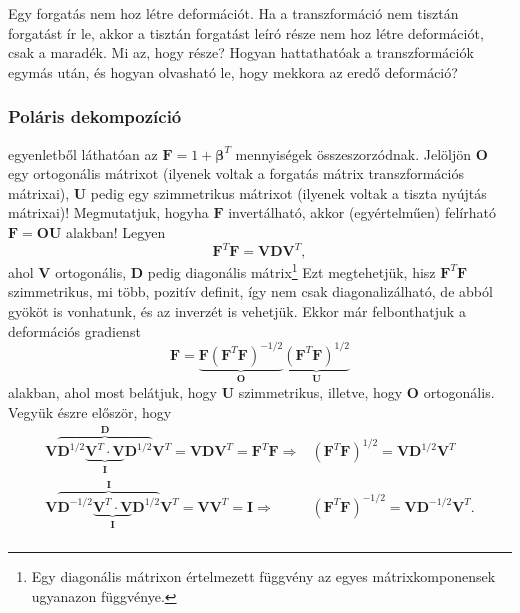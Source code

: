 \documentclass[12pt,a4paper]{scrartcl}
\let\mathbf\bm
\begin{document}
Egy forgatás nem hoz létre deformációt. Ha a transzformáció nem tisztán forgatást ír le, akkor a tisztán forgatást leíró része nem hoz létre deformációt, csak a maradék. Mi az, hogy része? Hogyan hattathatóak a transzformációk egymás után, és hogyan olvasható le, hogy mekkora az eredő deformáció?

\subsubsection{Poláris dekompozíció} \label{sec:polaris_dekomp}
\Az{\eqref{eq:disztrozio_def}} egyenletből láthatóan az ${\mathbf{F}} = 1 + {{\mathbf{\beta }}^T}$ mennyiségek összeszorzódnak. Jelöljön ${\mathbf{O}}$ egy ortogonális mátrixot (ilyenek voltak a forgatás mátrix transzformációs mátrixai), ${\mathbf{U}}$ pedig egy szimmetrikus mátrixot (ilyenek voltak a tiszta nyújtás mátrixai)! Megmutatjuk, hogyha ${\mathbf{F}}$ invertálható, akkor (egyértelműen) felírható ${\mathbf{F}} = {\mathbf{OU}}$ alakban!
Legyen
\[{{\mathbf{F}}^T}{\mathbf{F}} = {\mathbf{VD}}{{\mathbf{V}}^T},\]
ahol ${\mathbf{V}}$ ortogonális, ${{\mathbf{D}}}$ pedig diagonális mátrix\footnote{Egy diagonális mátrixon értelmezett függvény az egyes mátrixkomponensek ugyanazon függvénye.} Ezt megtehetjük, hisz ${{\mathbf{F}}^T}{\mathbf{F}}$ szimmetrikus, mi több, pozitív definit, így nem csak diagonalizálható, de abból gyököt is vonhatunk, és az inverzét is vehetjük. Ekkor már felbonthatjuk a deformációs gradienst
\[{\mathbf{F}} = \underbrace {{\mathbf{F}}{{\left( {{{\mathbf{F}}^T}{\mathbf{F}}} \right)}^{ - 1/2}}}_{\mathbf{O}}\underbrace {{{\left( {{{\mathbf{F}}^T}{\mathbf{F}}} \right)}^{1/2}}}_{\mathbf{U}}\]
alakban, ahol most belátjuk, hogy ${\mathbf{U}}$ szimmetrikus, illetve, hogy ${\mathbf{O}}$ ortogonális.
Vegyük észre először, hogy 
\[\begin{aligned}
  {\mathbf{V}}\overbrace {{{\mathbf{D}}^{1/2}}\underbrace {{{\mathbf{V}}^T} \cdot {\mathbf{V}}}_{\mathbf{I}}{{\mathbf{D}}^{1/2}}}^{\mathbf{D}}{{\mathbf{V}}^T} = {\mathbf{VD}}{{\mathbf{V}}^T} = {{\mathbf{F}}^T}{\mathbf{F}} \Rightarrow  & {\left( {{{\mathbf{F}}^T}{\mathbf{F}}} \right)^{1/2}} = {\mathbf{V}}{{\mathbf{D}}^{1/2}}{{\mathbf{V}}^T} \\ 
  {\mathbf{V}}\overbrace {{{\mathbf{D}}^{ - 1/2}}\underbrace {{{\mathbf{V}}^T} \cdot {\mathbf{V}}}_{\mathbf{I}}{{\mathbf{D}}^{1/2}}}^{\mathbf{I}}{{\mathbf{V}}^T} = {\mathbf{V}}{{\mathbf{V}}^T} = {\mathbf{I}} \Rightarrow  & {\left( {{{\mathbf{F}}^T}{\mathbf{F}}} \right)^{ - 1/2}} = {\mathbf{V}}{{\mathbf{D}}^{ - 1/2}}{{\mathbf{V}}^T}. \\ 
\end{aligned} \]
\end{document}
